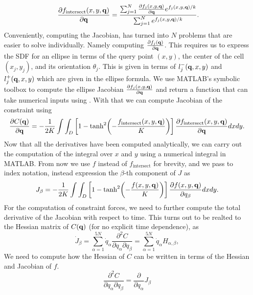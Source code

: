 \begin{equation*}\
\pdv{f_{\textrm{intersect}}(x,y,\vb{q})}{\vb{q}} = \frac{ \sum_{j=1}^N \pdv{f_j(x,y,\vb{q})}{\vb{q}}e^{f_j(x,y,\vb{q})/k}}{ \sum_{j=1}^N e^{f_j(x,y,\vb{q})/k}}.
\end{equation*}
Conveniently, computing the Jacobian, has turned into $N$ problems that are easier to solve individually. Namely computing $\pdv{f_j(\vb{q})}{\vb{q}}$.
This requires us to express the SDF for an ellipse in terms of the query point $(x,y)$, the center of the cell $(x_j,y_j)$, and its orientation $\theta_j$. This
is given in terms of $l_j^-(\vb{q}, x, y)$ and $l_j^+(\vb{q}, x, y)$ which are given in the ellipse formula. We use MATLAB's symbolic toolbox to compute the
ellipse Jacobian $\pdv{f_j(x,y,\vb{q})}{\vb{q}}$ and return a function that can take numerical inputs using .
With that we can compute Jacobian of the constraint using
\begin{equation} 
    \pdv{C(\vb{q})}{\vb{q}} = -\frac{1}{2K} \int \int_D \left[ 1- \tanh[2]( -\frac{f_{\textrm{intersect}}(x,y,\vb{q})}{K}) \right] \pdv{f_{\textrm{intersect}}(x,y,\vb{q})}{\vb{q}} dx dy.
\end{equation}
Now that all the derivatives have been computed analytically, we can carry out the computation of the integral over $x$ and $y$ using a numerical integral in MATLAB.
From now we use $f$ instead of $f_{\textrm{intersect}}$ for brevity, and we pass to index notation, instead expression the $\beta$-th component of $J$ as 
\begin{equation}
J_{\beta} = -\frac{1}{2K} \int \int_D \left[ 1- \tanh[2]( -\frac{f(x,y,\vb{q})}{K}) \right] \pdv{f(x,y,\vb{q})}{q_{\beta}} dx dy.
\end{equation}
For the computation of constraint forces, we need to further compute the total derivative of the Jacobian with respect to time. This turns 
out to be realted to the Hessian matrix of $C(\vb{q})$ (for no explicit time dependence), as 
\begin{equation*}
    \dot{J}_{\beta} = \sum_{\alpha = 1}^{5N} \dot{q}_{\alpha} \frac{\partial^2 C}{ \partial q_{\alpha} \partial q_{\beta}} = \sum_{\alpha = 1}^{5N} \dot{q}_{\alpha} H_{\alpha, \beta},
\end{equation*}
We need to compute how the Hessian of $C$ can be written in terms of the Hessian and Jacobian of $f$.
\begin{equation}
    \frac{\partial^2 C}{ \partial q_{\alpha} \partial q_{\beta}} = \frac{\partial }{\partial q_{\alpha}} J_{\beta}
\end{equation}
